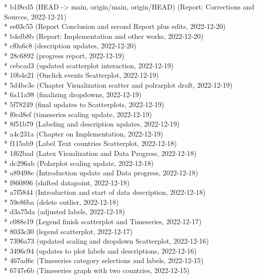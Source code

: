 \documentclass[usegeometry=true]{scrartcl}
\begin{document}
* b1f8cd5 (HEAD -> main, origin/main, origin/HEAD) (Report: Corrections and Sources, 2022-12-21) \\
* ee03c55 (Report Conclusion and second Report plus edits, 2022-12-20) \\
* b4efb8b (Report: Implementation and other works, 2022-12-20) \\
* cf0a6c8 (description updates, 2022-12-20)\\
* 28c6892 (progress report, 2022-12-19)\\
* cebcad3 (updated scatterplot interaction, 2022-12-19)\\
* 10b4e21 (Onclick events Scatterplot, 2022-12-19)\\
* 5d4bc3e (Chapter Visualization scatter and polrarplot draft, 2022-12-19)\\
* 6a11a98 (finalizing dropdowns, 2022-12-19)\\
* 5f78249 (final updates to Scatterplots, 2022-12-19)\\
* f0cd8ef (timeseries scaling update, 2022-12-19)\\
* 8f51b79 (Labeling and description updates, 2022-12-19)\\
* a4c231a (Chapter on Implementation, 2022-12-19)\\
* f115ab9 (Label Text countries Scatterplot, 2022-12-18)\\
* 1f62bad (Latex Visualization and Data Progress, 2022-12-18)\\
* dc296ab (Polarplot scaling update, 2022-12-18)\\
* a89498e (Introduction update and Data progress, 2022-12-18)\\
* f860896 (shifted datapoint, 2022-12-18)\\
* a7f5844 (Introduction and start of data description, 2022-12-18)\\
* 59e86ba (delete outlier, 2022-12-18)\\
* d3a75da (adjusted labels, 2022-12-18)\\
* c088e19 (Legend finish scatterplot and Timeseries, 2022-12-17)\\
* 8033c30 (legend scatterplot, 2022-12-17)\\
* 7396a73 (updated scaling and dropdown Scatterplot, 2022-12-16)\\
* 3496c94 (updates to plot labels and descriptions, 2022-12-16)\\
* 467ad6c (Timeseries category selections and labels, 2022-12-15)\\
* 6747e6b (Timeseries graph with two countries, 2022-12-15)\\
\end{document}
